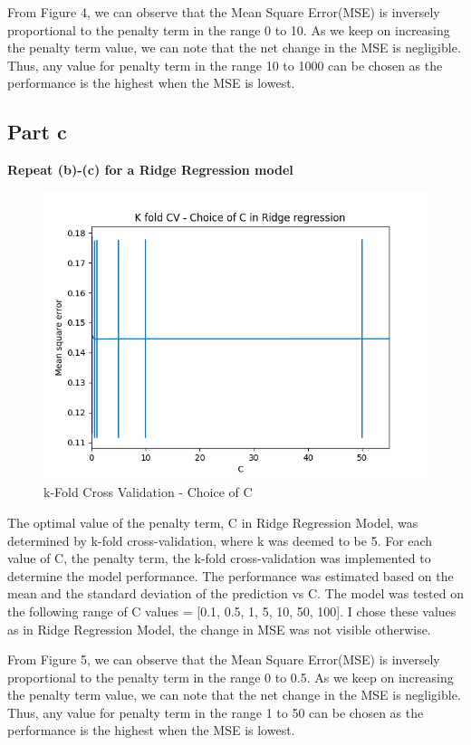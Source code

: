 \documentclass[10pt]{article}
\begin{document}
From Figure 4, we can observe that the Mean Square Error(MSE) is inversely proportional
to the penalty term in the range 0 to 10. As we keep on increasing the penalty term value,
we can note that the net change in the MSE is negligible. Thus, any value for penalty term
in the range 10 to 1000 can be chosen as the performance is the highest when the MSE is lowest.

\subsection*{Part c}
\textbf{ Repeat (b)-(c) for a Ridge Regression model}
\begin{figure}[H]
  \begin{center}
    \includegraphics[scale=0.4]{./images/Figure_5.png}
    \caption{k-Fold Cross Validation - Choice of C}
  \end{center}
\end{figure}

The optimal value of the penalty term, C in Ridge Regression Model, was determined by k-fold
cross-validation, where k was deemed to be 5. For each value of C, the penalty term, the k-fold
cross-validation was implemented to determine the model performance. The performance was estimated
based on the mean and the standard deviation of the prediction vs C.
The model was tested on the following range of C values = [0.1, 0.5, 1, 5, 10, 50, 100]. I chose
these values as in Ridge Regression Model, the change in MSE was not visible otherwise.

From Figure 5, we can observe that the Mean Square Error(MSE) is inversely proportional
to the penalty term in the range 0 to 0.5. As we keep on increasing the penalty term value,
we can note that the net change in the MSE is negligible. Thus, any value for penalty term
in the range 1 to 50 can be chosen as the performance is the highest when the MSE is lowest.
\end{document}

